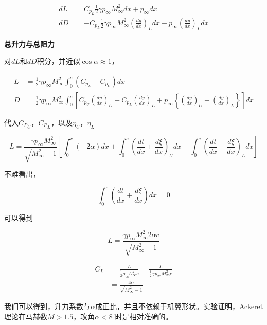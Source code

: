 \begin{align*}
    d L&=C_{p_{L}} \frac{1}{2} \gamma p_{\infty} M_{\infty}^{2} d x+p_{\infty} d x\\ 
    d D&=-C_{p_{L}} \frac{1}{2} \gamma p_{\infty} M_{\infty}^{2}\left(\frac{d y}{d x}\right)_{L} d x-p_{\infty}\left(\frac{d y}{d x}\right)_{L} d x
\end{align*}

\textbf{总升力与总阻力}

对$dL$和$dD$积分，并近似$\cos\alpha\approx 1$，

\begin{align*}
    L&=\frac{1}{2} \gamma p_{\infty} M_{\infty}^{2} \int_{0}^{c}\left(C_{p_{L}}-C_{p_{U}}\right) d x\\ 
    D&=\frac{1}{2} \gamma p_{\infty} M_{\infty}^{2} \int_{0}^{c}\left[C_{p_{U}}\left(\frac{d y}{d x}\right)_{U}-C_{p_{L}}\left(\frac{d y}{d x}\right)_{L}+p_{\infty}\left\{\left(\frac{d y}{d x}\right)_{U}-\left(\frac{d y}{d x}\right)_{L}\right\}\right] d x
\end{align*}

代入${C_P}_U$，${C_P}_L$，以及$\eta_U$，$\eta_L$

\begin{equation*}
    L=\frac{-\gamma p_{\infty} M_{\infty}^{2}}{\sqrt{M_{\infty}^{2}-1}}\left[\int_{0}^{c}(-2 \alpha) d x+\int_{0}^{c}\left(\frac{d t}{d x}+\frac{d \xi}{d x}\right)_{U} d x-\int_{0}^{c}\left(\frac{d t}{d x}-\frac{d \xi}{d x}\right)_{L} d x\right]
\end{equation*}

不难看出，

\begin{equation*}
    \int_{0}^{c}\left(\frac{d t}{d x}+\frac{d \xi}{d x}\right) d x=0
\end{equation*}

可以得到

\begin{equation*}
    L=\frac{\gamma p_{\infty} M_{\infty}^{2} 2 \alpha c}{\sqrt{M_{\infty}^{2}-1}}
\end{equation*}

\begin{align*}
    C_{L}&=\frac{L}{\frac{1}{2} \rho_{\infty} U_{\infty}^{2} c}=\frac{L}{\frac{1}{2} \gamma p_{\infty} M_{\infty}^{2} c}\\ 
    &=\frac{4 \alpha}{\sqrt{M_{\infty}^{2}-1}}
\end{align*}

我们可以得到，升力系数与$\alpha$成正比，并且不依赖于机翼形状。实验证明，Ackeret理论在马赫数$M>1.5$，攻角$\alpha<8^\circ$时是相对准确的。

